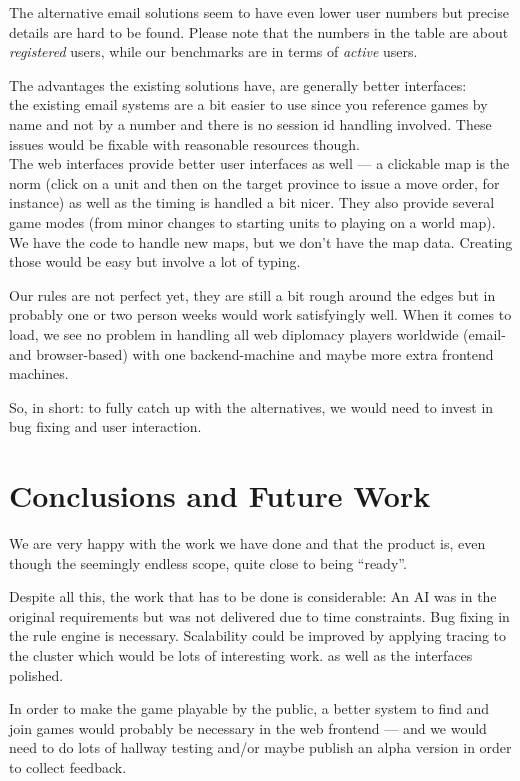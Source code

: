 \documentclass[11pt,a4paper]{report}
\begin{document}
The alternative email solutions seem to have even lower user numbers but precise
details are hard to be found. Please note that the numbers in
the table are about {\em registered\/} users, while our benchmarks are in terms
of {\em active\/} users.

The advantages the existing solutions have, are generally better interfaces: \\
the existing email systems are a bit easier to use since you reference games by
name and not by a number and there is no session id handling involved.
These issues would be fixable with reasonable resources though. \\
The web interfaces provide better user interfaces as well --- a clickable map
is the norm (click on a unit and then on the target province to issue a move
order, for instance) as well as the timing is handled a bit nicer. They also
provide several game modes (from minor changes to starting units to playing on
a world map). We have the code to handle new maps, but we don't have the map
data. Creating those would be easy but involve a lot of typing.

Our rules are not perfect yet, they are still a bit rough around the edges but
in probably one or two person weeks would work satisfyingly well.
When it comes to load, we see no problem in handling all web diplomacy
players worldwide (email- and browser-based) with one backend-machine and maybe
more extra frontend machines.

So, in short: to fully catch up with the alternatives, we would need to invest
in bug fixing and user interaction.

\chapter{Conclusions and Future Work}
We are very happy with the work we have done and that the product is, even though
the seemingly endless scope, quite close to being ``ready''.

Despite all this, the work that has to be done is considerable:
An AI was in the original requirements but was not delivered due to time constraints.
Bug fixing in the rule engine is necessary. Scalability could be improved by applying
tracing to the cluster which would be lots of interesting work. as well as the
interfaces polished.

In order to make the game playable by the public, a better system to find and join 
games would probably be necessary in the web frontend --- and we would need to
do lots of hallway testing and/or maybe publish an alpha version in order to collect
feedback.
\end{document}
